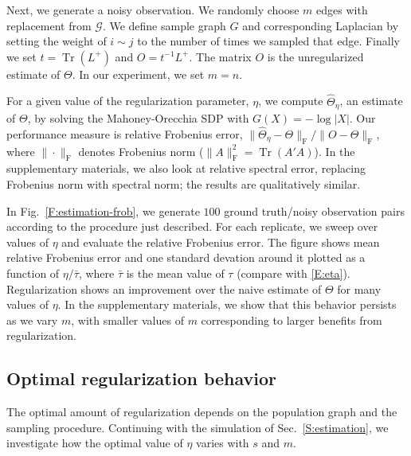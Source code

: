 \documentclass[12pt]{article}
\DeclareMathOperator*{\Tr}{Tr}
\theoremstyle{plain}
\begin{document}
Next, we generate a noisy observation.  We randomly choose $m$ edges
with replacement from $\mathcal{G}$.  We define sample graph $G$
and corresponding Laplacian by setting the weight of $i \sim j$
to the number of times we sampled that edge.  Finally we set
$t = \Tr(L^+)$ and $O = t^{-1} L^+$.  The matrix $O$ is the
unregularized estimate of $\Theta$.  In our experiment, we set $m = n$.

For a given value of the regularization parameter, $\eta$, we compute
$\hat \Theta_\eta$, an estimate of $\Theta$, by solving the
Mahoney-Orecchia SDP with $G(X) = -\log|X|$.  Our performance measure
is relative Frobenius error, $\| \hat \Theta_\eta - \Theta \|_\mathrm{F} / \| O - \Theta
\|_\mathrm{F}$, where $\| \cdot \|_\mathrm{F}$ denotes Frobenius norm
($\|A\|_\mathrm{F}^2 = \Tr(A' A)$).  In the supplementary materials,
we also look at relative spectral error, replacing Frobenius norm with
spectral norm; the results are qualitatively similar.


In Fig.~\ref{F:estimation-frob}, we generate $100$ ground truth/noisy
observation pairs according to the procedure just described.  For each
replicate, we sweep over values of $\eta$ and evaluate the relative
Frobenius error.  The figure shows mean relative Frobenius error and
one standard devation around it plotted as a function of
$\eta / \bar \tau$, where $\bar \tau$ is the mean value of $\tau$
(compare with \eqref{E:eta}).  Regularization shows an improvement
over the naive estimate of $\Theta$ for many values of $\eta$.  In the
supplementary materials, we show that this behavior persists as we
vary $m$, with smaller values of $m$ corresponding to larger benefits
from regularization.



\subsection{Optimal regularization behavior}

The optimal amount of regularization depends on the population graph
and the sampling procedure.  Continuing with the simulation of
Sec.~\ref{S:estimation}, we investigate how the optimal value of
$\eta$ varies with $s$ and $m$.
\end{document}
